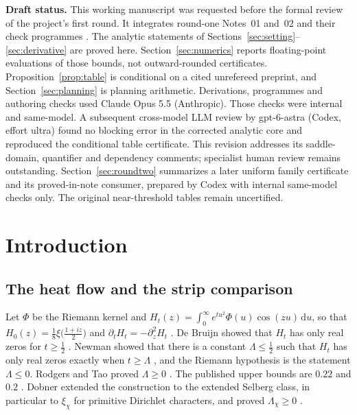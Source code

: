 \documentclass[11pt]{article}
\theoremstyle{definition}
\theoremstyle{remark}
\newcommand{\dd}{\,\mathrm d}
\numberwithin{equation}{section}
\begin{document}
\noindent\textbf{Draft status.}
This working manuscript was requested before the formal review of the
project's first round. It integrates round-one Notes~01 and~02
\cite{n01,n02} and their check programmes \cite{records}. The analytic
statements of Sections~\ref{sec:setting}--\ref{sec:derivative} are proved
here. Section~\ref{sec:numerics} reports floating-point evaluations of
those bounds, not outward-rounded certificates. Proposition~\ref{prop:table}
is conditional on a cited unrefereed preprint, and
Section~\ref{sec:planning} is planning arithmetic. Derivations, programmes
and authoring checks used Claude Opus 5.5 (Anthropic). Those checks were
internal and same-model. A subsequent cross-model LLM review by
gpt-6-astra (Codex, effort ultra) found no blocking error in the corrected
analytic core and reproduced the conditional table certificate. This
revision addresses its saddle-domain, quantifier and dependency comments;
specialist human review remains outstanding. Section~\ref{sec:roundtwo}
summarizes a later uniform family certificate and its proved-in-note
consumer, prepared by Codex with internal same-model checks only.
The original near-threshold tables remain uncertified.

\section{Introduction}\label{sec:intro}

\subsection{The heat flow and the strip comparison}

Let $\Phi$ be the Riemann kernel and
$H_t(z)=\int_0^\infty e^{tu^2}\Phi(u)\cos(zu)\dd u$, so that
$H_0(z)=\frac18\xi\bigl(\frac{1+iz}2\bigr)$ and $\partial_tH_t=-\partial_z^2H_t$
\cite{polymath}. De Bruijn showed that $H_t$ has only real zeros for
$t\ge\frac12$ \cite{debruijn}. Newman showed that there is a constant
$\Lambda\le\frac12$ such that $H_t$ has only real zeros exactly when
$t\ge\Lambda$ \cite{newman}, and the Riemann hypothesis is the statement
$\Lambda\le0$. Rodgers and Tao proved $\Lambda\ge0$ \cite{rodgerstao}. The
published upper bounds are $0.22$ \cite{polymath} and $0.2$
\cite{platttrudgian}. Dobner extended the construction to the extended
Selberg class, in particular to $\xi_\chi$ for primitive Dirichlet
characters, and proved $\Lambda_\chi\ge0$ \cite{dobner}.
\end{document}
